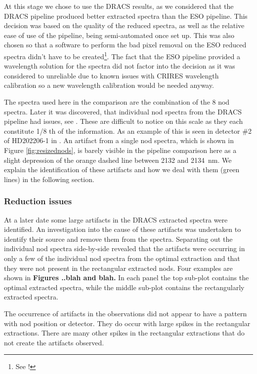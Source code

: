 At this stage we chose to use the DRACS results, as we considered that the DRACS pipeline produced better extracted spectra than the ESO pipeline. This decision was based on the quality of the reduced spectra, as well as the relative ease of use of the pipeline, being semi-automated once set up. This was also chosen so that a software to perform the bad pixel removal on the ESO reduced spectra didn't have to be created\footnote{See !}. The fact that the ESO pipeline provided a wavelength solution for the spectra did not factor into the decision as it was considered to unreliable due to known issues with CRIRES wavelength calibration so a new wavelength calibration would be needed anyway.

The spectra used here in the comparison are the combination of the 8 nod spectra. Later it was discovered, that individual nod spectra from the DRACS pipeline had issues, see . These are difficult to notice on this scale as they each constitute 1/8 th of the information. As an example of this is seen in detector \#2 of HD202206-1 in . An artifact from a single nod spectra, which is shown in Figure \ref{fig:resizednods}, is barely visible in the pipeline comparison here as a slight depression of the orange dashed line between 2132 and 2134~nm. We explain the identification of these artifacts and how we deal with them (green lines) in the following section.

\subsubsection{Reduction issues}
\label{subsubsec:reductionartifacts}
At a later date some large artifacts in the DRACS extracted spectra were identified. An investigation into the cause of these artifacts was undertaken to identify their source and remove them from the spectra. Separating out the individual nod spectra side-by-side revealed that the artifacts were occurring in only a few of the individual nod spectra from the optimal extraction and that they were not present in the rectangular extracted nods. Four examples are shown in \textbf{Figures ..blah and blah.} In each panel the top sub-plot contains the optimal extracted spectra, while the middle sub-plot contains the rectangularly extracted spectra.


The occurrence of artifacts in the observations did not appear to have a pattern with nod position or detector. They do occur with large spikes in the rectangular extractions. There are many other spikes in the rectangular extractions that do not create the artifacts observed. 

